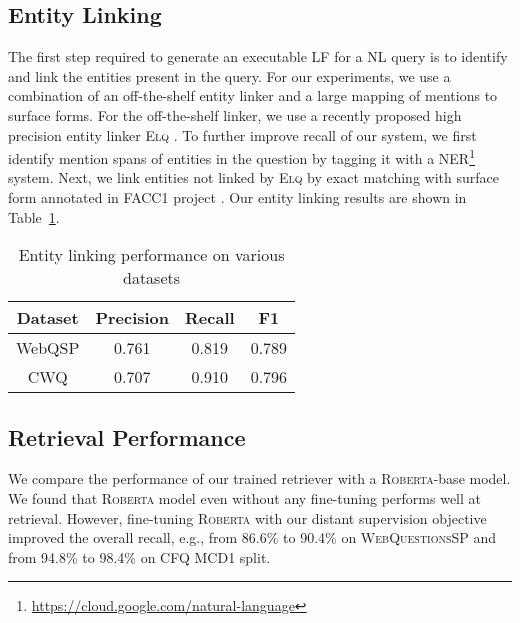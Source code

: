 \documentclass{article}
\newcommand{\roberta}{\textsc{Roberta}\xspace}
\newcommand{\webqsp}{\textsc{WebQuestionsSP}\xspace}
\begin{document}
\subsection{Entity Linking}
\label{sub:entity_linking}
The first step required to generate an executable LF for a NL query is to identify and link the entities present in the query. For our experiments, we use a combination of an off-the-shelf entity linker and a large mapping of mentions to surface forms. For the off-the-shelf linker, we use a recently proposed high precision entity linker \textsc{Elq} \cite{li2020efficient}. To further improve recall of our system, we first identify mention spans of entities in the question by tagging it with a NER\footnote{\url{https://cloud.google.com/natural-language}} system. Next, we link entities not linked by \textsc{Elq} by exact matching with surface form annotated in FACC1 project \cite{facc1}. Our entity linking results are shown in Table~\ref{tab:el_results}.
\begin{table}[]
    \centering
    \small
    \begin{tabular}{c c c c}
    \toprule
    Dataset &  Precision & Recall & F1\\\midrule
    WebQSP  & 0.761   & 0.819 & 0.789\\
    CWQ & 0.707 & 0.910 & 0.796\\\bottomrule
    \end{tabular}
    \caption{Entity linking performance on various datasets}
    \label{tab:el_results}
    \vspace{-1em}
\end{table}

\subsection{Retrieval Performance}
We compare the performance of our trained retriever with a \roberta-base model. We found that \roberta model even without any fine-tuning performs well at retrieval. However, fine-tuning \roberta with our distant supervision objective improved the overall recall, e.g., from 86.6\% to 90.4\% on \webqsp and from 94.8\% to 98.4\% on CFQ MCD1 split.
\end{document}

